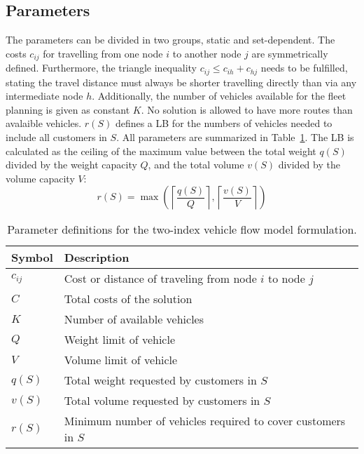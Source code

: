 \subsection*{Parameters}
The parameters can be divided in two groups, static and set-dependent.
The costs $c_{ij}$ for travelling from one node $i$ to another node $j$
are symmetrically defined. Furthermore, the triangle inequality
$c_{ij} \leq c_{ih} + c_{hj}$ needs to be fulfilled, stating the travel distance must always be shorter travelling
directly than via any intermediate node $h$. Additionally, the number of vehicles
available for the fleet planning is given as constant $K$. No solution is allowed to have
more routes than avalaible vehicles. $r(S)$ defines a \gls{LB} for the numbers of vehicles needed
to include all customers in $S$. All parameters are summarized in Table~\ref{tab:parameter_definitions}.
The \gls{LB} is calculated as the ceiling of the maximum
value between the total weight $q(S)$ divided by the weight capacity $Q$, and the
total volume $v(S)$ divided by the volume capacity $V$:
\[r(S) = \max\left( \left\lceil \frac{q(S)}{Q} \right\rceil, \left\lceil \frac{v(S)}{V} \right\rceil \right)\]
\begin{table}[ht]
    \centering
    \begin{tabular}{ll}
        \toprule
        Symbol   & Description                                                   \\
        \midrule
        $c_{ij}$ & Cost or distance of traveling from node $i$ to node $j$       \\
        $C$      & Total costs of the solution                                   \\
        $K$      & Number of available vehicles                                  \\
        $Q$      & Weight limit of vehicle                                       \\
        $V$      & Volume limit of vehicle                                       \\
        $q(S)$   & Total weight requested by customers in $S$                    \\
        $v(S)$   & Total volume requested by customers in $S$                    \\
        $r(S)$   & Minimum number of vehicles required to cover customers in $S$ \\
        \bottomrule
    \end{tabular}
    \caption{Parameter definitions for the two-index vehicle flow model formulation.}
    \label{tab:parameter_definitions}
\end{table}

